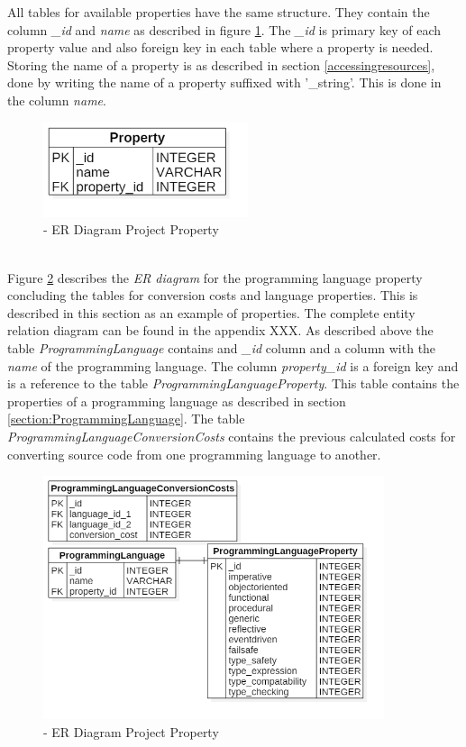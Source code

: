 All tables for available properties have the same structure. They contain the column \textit{\_id} and \textit{name} as described in figure \ref{fig:erproperty}. The \textit{\_id} is primary key of each property value and also foreign key in each table where a property is needed. Storing the name of a property is as described in section \ref{accessingresources}, done by writing the name of a property suffixed with '\_string'. This is done in the column \textit{name}.\\
\begin{figure}[h] 
	\centering 
	\includegraphics[width=6cm]{images/ERProperty.png} 
	\caption{- ER Diagram Project Property} 
	\label{fig:erproperty}
\end{figure}\\
Figure \ref{fig:plproperty} describes the \textit{ER diagram} for the programming language property concluding the tables for conversion costs and language properties. This is described in this section as an example of properties. The complete entity relation diagram can be found in the appendix XXX. As described above the table \textit{ProgrammingLanguage} contains and \textit{\_id} column and a column with the \textit{name} of the programming language. The column \textit{property\_id} is a foreign key and is a reference to the table \textit{ProgrammingLanguageProperty}. This table contains the properties of a programming language as described in section \ref{section:ProgrammingLanguage}. The table \textit{ProgrammingLanguageConversionCosts} contains the previous calculated costs for converting source code from one programming language to another.  
\begin{figure}[h] 
	\centering 
	\includegraphics[width=10cm]{images/PLProperty.png} 
	\caption{- ER Diagram Project Property} 
	\label{fig:plproperty}
\end{figure}\\

